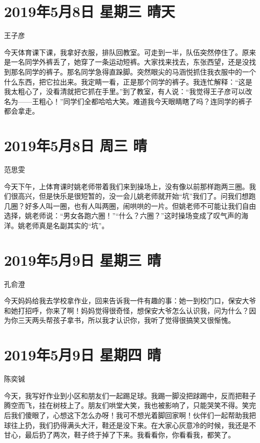 \section{2019年5月8日 星期三 晴天}

王子彦

今天体育课下课，我拿好衣服，排队回教室。可走到一半，队伍突然停住了。原来是一名同学外裤丢了，她穿了一条运动短裤。大家找来找去，东张西望，还是没找到那名同学的裤子。那名同学急得直跺脚。突然眼尖的马涵悦抓住我衣服中的一个什么东西，把它拉出来。我定睛一看，正是那个同学的裤子。我连忙解释：“这是我太粗心了，没看清就把它抓在手里。”到了教室，有人说：“我觉得王子彦可以改名为——王粗心！”同学们全都哈哈大笑。难道我今天眼睛瞎了吗？连同学的裤子都会拿走。

\section{2019年5月8日 周三 晴}

范思雯

今天下午，上体育课时姚老师带着我们来到操场上，没有像以前那样跑两三圈。我们很高兴，但是快乐是很短暂的，没一会儿姚老师就开始“坑”我们了。问我们想跑几圈？好多人叫一圈，也有人叫两圈，闹哄哄的一片。但姚老师不可能让我们自由选择，姚老师说：“男女各跑六圈！”“什么？六圈？”这时操场变成了叹气声的海洋。姚老师真是名副其实的“坑”。

\section{2019年5月9日 星期三 晴}

孔俞澄

今天妈妈给我去学校拿作业，回来告诉我一件有趣的事：她一到校门口，保安大爷和她打招呼，你来了啊！妈妈觉得很奇怪，想保安大爷怎么认识我，问为什么？因为你三天两头帮孩子拿书，所以我才认识你，我听了觉得很搞笑又很惭愧。

\section{2019年5月9日 星期四 晴}

陈奕铖

今天，我写好作业到小区和朋友们一起踢足球。我踢一脚没把䟵踢中，反而把鞋子腾空而飞，挂在树枝上了。朋友们哄堂大笑，我也被影响了，只能哭笑不得。笑完后我们傻眼了，心想这下怎么办呀！我可不想光着脚回家啊！伙伴们一起帮助我把球往上扔，我们扔得满头大汗，鞋还是没下来。在大家心灰意冷的时候，我还是不甘心，最后扔了两次，鞋子终于掉了下来。我看看你，你看看我，都笑了。


